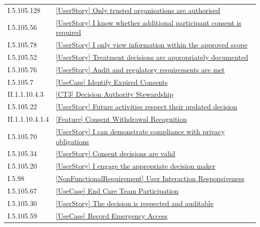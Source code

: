 \begin{longtable}{p{.22\linewidth}p{.73\linewidth}}
I.5.105.128 & \hyperref[element:03ce7cbe656d4c7da4e7de899dea88f0]{[UserStory] Only trusted organisations are authorised} \\
I.5.105.56 & \hyperref[element:05320821154840d5bb1f5140ad13ef4b]{[UserStory] I know whether additional participant consent is required} \\
I.5.105.78 & \hyperref[element:072f073836e34c13848a902f18c00a73]{[UserStory] I only view information within the approved scope} \\
I.5.105.52 & \hyperref[element:0804466d75ad43c8ac740ac47e37fb95]{[UserStory] Treatment decisions are appropriately documented} \\
I.5.105.76 & \hyperref[element:099a6a3867e642549643b118e369f373]{[UserStory] Audit and regulatory requirements are met} \\
I.5.105.7 & \hyperref[element:09cd5c431561460588fd980ccdc1bcce]{[UseCase] Identify Expired Consents} \\
II.1.1.10.4.3 & \hyperref[element:0a6a09b437284490a8eaeca204c7649b]{[CT3] Decision Authority Stewardship} \\
I.5.105.22 & \hyperref[element:0bdb4633f5da4c8ebd606ed8887b2331]{[UserStory] Future activities respect their updated decision} \\
II.1.1.10.4.1.4 & \hyperref[element:0c62ec2bdd324815ba743a9b6b5f0ff3]{[Feature] Consent Withdrawal Recognition} \\
I.5.105.70 & \hyperref[element:0cda4d7a2b424c6a835ad371de1706ab]{[UserStory] I can demonstrate compliance with privacy obligations} \\
I.5.105.34 & \hyperref[element:0cf63af1646f446c91ee6a9dc2a73750]{[UserStory] Consent decisions are valid} \\
I.5.105.20 & \hyperref[element:0e15653058994cf59d708a167aaaaf35]{[UserStory] I engage the appropriate decision maker} \\
I.5.98 & \hyperref[element:0f07f89a3a854bfdac4d4fc423feefca]{[NonFunctionalRequirement] User Interaction Responsiveness} \\
I.5.105.67 & \hyperref[element:0f5e6db7cd524036bd41b18c6ca21251]{[UseCase] End Care Team Participation} \\
I.5.105.30 & \hyperref[element:135bd864f7f64f13b9a3337eec376c3c]{[UserStory] The decision is respected and auditable} \\
I.5.105.59 & \hyperref[element:13b76be10f32483a9f8109f17ff2c4b4]{[UseCase] Record Emergency Access} \\

\end{longtable}
